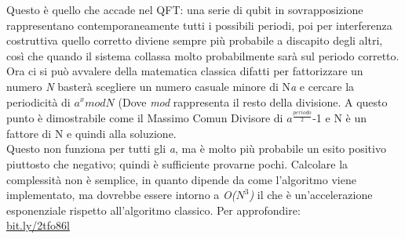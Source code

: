 Questo è quello che accade nel QFT: una serie di qubit in sovrapposizione rappresentano contemporaneamente tutti i possibili periodi, poi per interferenza costruttiva quello corretto diviene sempre più probabile a discapito degli altri, così che quando il sistema collassa molto probabilmente sarà sul periodo corretto.\\
Ora ci si può avvalere della matematica classica difatti per fattorizzare un numero \textit{N} basterà scegliere un numero casuale minore di N\textit{a} e cercare la periodicità di $a^x mod N$ (Dove \textit{mod} rappresenta il resto della divisione. A questo punto è dimostrabile come il Massimo Comun Divisore di $a^\frac{periodo}{2}$-1 e N è un fattore di N e quindi alla soluzione.\\
Questo non funziona per tutti gli \textit{a}, ma è molto più probabile un esito positivo piuttosto che negativo; quindi è sufficiente provarne pochi.
Calcolare la complessità non è semplice, in quanto dipende da come l'algoritmo viene implementato, ma dovrebbe essere intorno a \textit{O($N^3$)} il che è un'accelerazione esponenziale rispetto all'algoritmo classico.
Per approfondire:\\
\href{https://bit.ly/2tfo86l}{bit.ly/2tfo86l}